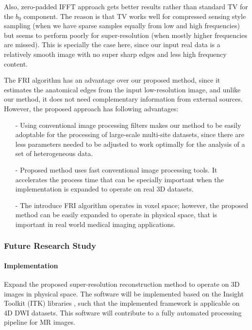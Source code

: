 Also, zero-padded IFFT approach gets better results rather than standard TV for the $b_0$ component. The reason is that TV works well for compressed sensing style sampling (when we have sparse samples equally from low and high frequencies) but seems to perform poorly for super-resolution (when mostly higher frequencies are missed). This is specially the case here, since our input real data is a relatively smooth image with no super sharp edges and less high frequency content.

The FRI algorithm has an advantage over our proposed method, since it estimates the anatomical edges from the input low-resolution image, and unlike our method, it does not need complementary information from external sources. However, the proposed approach has following advantages:
\begin{itemize}
\item[-] Using conventional image processing filters makes our method to be easily adoptable for the processing of large-scale multi-site datasets, since there are less parameters needed to be adjusted to work optimally for the analysis of a set of heterogeneous data.
\item[-] Proposed method uses fast conventional image processing tools. It accelerates the process time that can be specially important when the implementation is expanded to operate on real 3D datasets.
\item[-] The introduce FRI algorithm operates in voxel space; however, the proposed method can be easily expanded to operate in physical space, that is important in real world medical imaging applications.
\end{itemize}

\subsubsection{Future Research Study}

\paragraph{Implementation}

Expand the proposed super-resolution reconstruction method to operate on 3D images in physical space.
The software will be implemented based on the Insight Toolkit (ITK) libraries \cite{johnson2015itk1, johnson2015itk2}, such that the implemented framework is applicable on 4D DWI datasets. This software will contribute to a fully automated processing pipeline for MR images.


